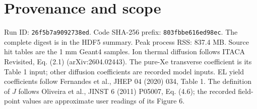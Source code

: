 \documentclass[11pt]{article}
\begin{document}
\section*{Provenance and scope}
Run ID: \texttt{26f5b7a9092738ed}. Code SHA-256 prefix: \texttt{803fbbe616ed98ec}. The complete digest is in the HDF5 summary.
Peak process RSS: 837.4 MB. Source hit tables are the 1 mm Geant4 samples.
Ion thermal diffusion follows ITACA Revisited, Eq. (2.1) (arXiv:2604.02443). The pure-Xe transverse coefficient is its Table 1 input; other diffusion coefficients are recorded model inputs. EL yield coefficients follow Fernandes et al., JHEP 04 (2020) 034, Table 1. The definition of $J$ follows Oliveira et al., JINST 6 (2011) P05007, Eq. (4.6); the recorded field-point values are approximate user readings of its Figure 6.
\end{document}
